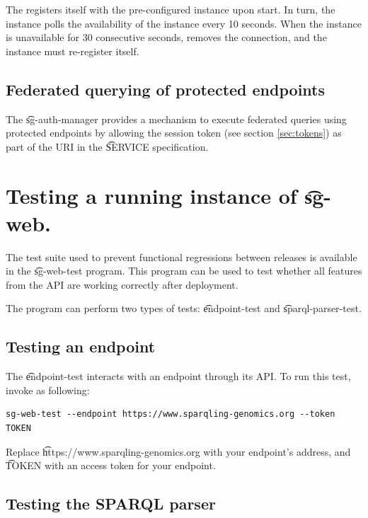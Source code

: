   The  registers itself with the pre-configured
   instance upon start.  In turn, the  instance
  polls the availability of the  instance every 10
  seconds.  When the  instance is unavailable for 30
  consecutive seconds,  removes the connection, and the
   instance must re-register itself.

\subsection{Federated querying of protected endpoints}

  The \t{sg-auth-manager} provides a mechanism to execute federated queries
  using protected endpoints by allowing the session token (see section
  \ref{sec:tokens}) as part of the URI in the \t{SERVICE} specification.

\pagebreak{}
\section{Testing a running instance of \t{sg-web}.}

  The test suite used to prevent functional regressions between releases is
  available in the \t{sg-web-test} program.  This program can be used to test
  whether all features from the API are working correctly after deployment.

  The program can perform two types of tests: \t{endpoint-test} and
  \t{sparql-parser-test}.

\subsection{Testing an endpoint}

  The \t{endpoint-test} interacts with an endpoint through its API.  To run
  this test, invoke  as following:

\begin{siderules}
\begin{verbatim}
sg-web-test --endpoint https://www.sparqling-genomics.org --token TOKEN
\end{verbatim}
\end{siderules}

  Replace \t{https://www.sparqling-genomics.org} with your endpoint's
  address, and \t{TOKEN} with an access token for your endpoint.

\subsection{Testing the SPARQL parser}

